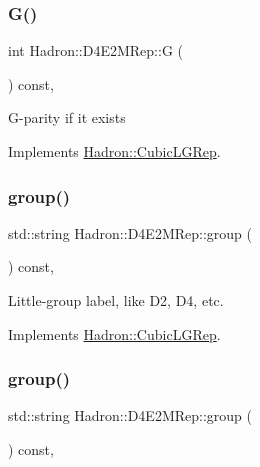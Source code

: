 \subsubsection{\texorpdfstring{G()}{G()}\hspace{0.1cm}{\footnotesize\ttfamily [2/2]}}
{\footnotesize\ttfamily int Hadron\+::\+D4\+E2\+M\+Rep\+::G (\begin{DoxyParamCaption}{ }\end{DoxyParamCaption}) const\hspace{0.3cm}{\ttfamily [inline]}, {\ttfamily [virtual]}}

G-\/parity if it exists 

Implements \mbox{\hyperlink{structHadron_1_1CubicLGRep_ace26f7b2d55e3a668a14cb9026da5231}{Hadron\+::\+Cubic\+L\+G\+Rep}}.

\mbox{\label{structHadron_1_1D4E2MRep_ac61a62d44384cf423d191db25dc0bc62}} 
\subsubsection{\texorpdfstring{group()}{group()}\hspace{0.1cm}{\footnotesize\ttfamily [1/2]}}
{\footnotesize\ttfamily std\+::string Hadron\+::\+D4\+E2\+M\+Rep\+::group (\begin{DoxyParamCaption}{ }\end{DoxyParamCaption}) const\hspace{0.3cm}{\ttfamily [inline]}, {\ttfamily [virtual]}}

Little-\/group label, like D2, D4, etc. 

Implements \mbox{\hyperlink{structHadron_1_1CubicLGRep_a9bdb14b519a611d21379ed96a3a9eb41}{Hadron\+::\+Cubic\+L\+G\+Rep}}.

\mbox{\label{structHadron_1_1D4E2MRep_ac61a62d44384cf423d191db25dc0bc62}} 
\subsubsection{\texorpdfstring{group()}{group()}\hspace{0.1cm}{\footnotesize\ttfamily [2/2]}}
{\footnotesize\ttfamily std\+::string Hadron\+::\+D4\+E2\+M\+Rep\+::group (\begin{DoxyParamCaption}{ }\end{DoxyParamCaption}) const\hspace{0.3cm}{\ttfamily [inline]}, {\ttfamily [virtual]}}

